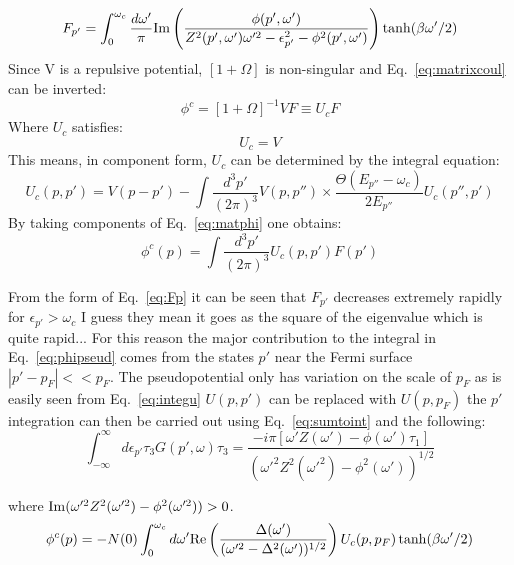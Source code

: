 \begin{equation}
\label{eq:Fp}
F_{p'}= \int_{0}^{\omega_{c}}\frac{d\omega'}{\pi}{\rm Im}\left(\frac{\phi(p',\omega')}{Z^{2}(p',\omega')\omega'^{2}
-\epsilon^{2}_{p'} -\phi^{2}(p',\omega') }\right)\tanh(\beta\omega'/2)
\end{equation}
%
Since V is a repulsive potential, $[1+\Omega]$ is non-singular and Eq.~\ref{eq:matrixcoul}
can be inverted:
\begin{equation}
\label{eq:matphi}
\phi^{c} = [1+\Omega]^{-1}VF \equiv U_{c}F
\end{equation}
%
Where $U_{c}$ satisfies:
%
\begin{equation}
[1+\Omega]U_{c} = V
\end{equation}
%
This means, in component form, $U_c$ can be determined by the integral equation:
%
\begin{equation}
\label{eq:integu}
U_{c}(p,p') = V(p-p') - \int \frac{d^{3}p'}{(2\pi)^{3}}V(p,p'')\times
\frac{\Theta(E_{p''}-\omega_{c})}{2E_{p''}}U_{c}(p'',p')
\end{equation}
%
By taking components of Eq.~\ref{eq:matphi} one obtains:
%
\begin{equation}
\label{eq:phipseud}
\phi^{c}(p) = \int \frac{d^{3}p'}{(2\pi)^{3}}U_{c}(p,p')F(p')
\end{equation}
%

From the form of Eq.~\ref{eq:Fp} it can be seen that $F_{p'}$ decreases extremely rapidly
for $\epsilon_{p'} > \omega_{c}$ I guess they mean it goes as the square of 
the eigenvalue which is quite rapid... For this reason
the major contribution to the integral in Eq.~\ref{eq:phipseud} comes from the states
$p'$ near the Fermi surface  $|p'-p_{F}|<<p_{F}$. The pseudopotential only has
variation on the scale of $p_{F}$ as is easily seen from Eq.~\ref{eq:integu} 
$U(p,p')$ can be replaced with $U(p,p_{F})$ the $p'$ integration can 
then be carried out using Eq.~\ref{eq:sumtoint} and the following:
%
\begin{equation}
\int_{-\infty}^{\infty}d\epsilon_{p'} \tau_{3}G(p',\omega)\tau_{3} =
\frac{-i\pi[\omega'Z(\omega') - \phi(\omega')\tau_{1}]}{(\omega'^{2}Z^{2}(\omega'^{2})-\phi^{2}(\omega'))^{1/2}}
\end{equation}

where ${\rm Im}(\omega'^{2}Z^{2}(\omega'^2) -\phi^{2}(\omega'^{2})) > 0$.
\begin{equation}
\phi^{c}(p) = -N(0) \int_{0}^{\omega_{c}} d\omega' {\rm Re}\left(\frac{\Delta(\omega')}{(\omega'^{2}-\Delta^{2}(\omega'))^{1/2}}\right)U_{c}(p,p_{F})\tanh(\beta \omega'/2)
\end{equation}

